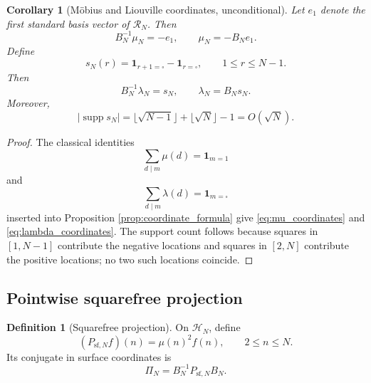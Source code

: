 \documentclass[11pt]{amsart}
\numberwithin{equation}{section}
\theoremstyle{plain}
\newtheorem{corollary}[theorem]{Corollary}
\theoremstyle{definition}
\newtheorem{definition}[theorem]{Definition}
\theoremstyle{remark}
\newcommand{\one}{\mathbf 1}
\newcommand{\mob}{\mu}
\newcommand{\liou}{\lambda}
\newcommand{\supp}{\operatorname{supp}}
\begin{document}
\begin{corollary}[Möbius and Liouville coordinates, unconditional]
\label{cor:mu_lambda_coordinates}
Let $e_1$ denote the first standard basis vector of $\mathcal R_N$.  Then
\begin{equation}
B_N^{-1}\mob_N=-e_1,
\qquad
\mob_N=-B_Ne_1.
\label{eq:mu_coordinates}
\end{equation}
Define
\begin{equation}
s_N(r)=\one_{r+1=\square}-\one_{r=\square},
\qquad 1\le r\le N-1.
\label{eq:sN_definition}
\end{equation}
Then
\begin{equation}
B_N^{-1}\liou_N=s_N,
\qquad
\liou_N=B_Ns_N.
\label{eq:lambda_coordinates}
\end{equation}
Moreover,
\begin{equation}
|\supp s_N|
=\lfloor\sqrt{N-1}\rfloor+\lfloor\sqrt N\rfloor-1
=O(\sqrt N).
\label{eq:sN_support}
\end{equation}
\end{corollary}

\begin{proof}
The classical identities
\begin{equation}
\sum_{d\mid m}\mob(d)=\one_{m=1}
\label{eq:mobius_divisor_sum}
\end{equation}
and
\begin{equation}
\sum_{d\mid m}\liou(d)=\one_{m=\square}
\label{eq:liouville_divisor_sum}
\end{equation}
inserted into Proposition \ref{prop:coordinate_formula} give \eqref{eq:mu_coordinates} and \eqref{eq:lambda_coordinates}.  The support count follows because squares in $[1,N-1]$ contribute the negative locations and squares in $[2,N]$ contribute the positive locations; no two such locations coincide.
\end{proof}

\subsection{Pointwise squarefree projection}
\label{subsec:pointwise_squarefree}

\begin{definition}[Squarefree projection]
\label{def:squarefree_projection}
On $\mathcal H_N$, define
\begin{equation}
(P_{\mathrm{sf},N}f)(n)=\mob(n)^2f(n),
\qquad 2\le n\le N.
\label{eq:squarefree_projection}
\end{equation}
Its conjugate in surface coordinates is
\begin{equation}
\Pi_N=B_N^{-1}P_{\mathrm{sf},N}B_N.
\label{eq:PiN_definition}
\end{equation}
\end{definition}
\end{document}
